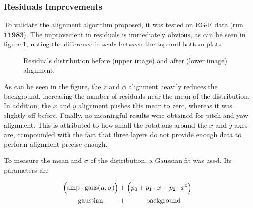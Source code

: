 \subsubsection{Residuals Improvements}
    To validate the alignment algorithm proposed, it was tested on RG-F data (run $\mathbf{11983}$).
    The improvement in residuals is immediately obvious, as can be seen in figure \ref{fig::res_comparison}, noting the difference in scale between the top and bottom plots.

    \begin{figure}[t!]
        \centering{}
        \caption[Residuals distribution improvement.]{Residuals distribution before (upper image) and after (lower image) alignment.}
        \label{fig::res_comparison}
    \end{figure}

    As can be seen in the figure, the $z$ and $\phi$ alignment heavily reduces the background, increasing the number of residuals near the mean of the distribution.
    In addition, the $x$ and $y$ alignment pushes this mean to zero, whereas it was slightly off before.
    Finally, no meaningful results were obtained for pitch and yaw alignment.
    This is attributed to how small the rotations around the $x$ and $y$ axes are, compounded with the fact that three layers do not provide enough data to perform alignment precise enough.

    To measure the mean and $\sigma$ of the distribution, a Gaussian fit was used.
    Its parameters are

     \begin{align*}
        \Big( \text{amp} \cdot \text{gaus}(\mu, \sigma) \Big) &+ \Big( p_0 + p_1\cdot x + p_2\cdot x^2 \Big) \\
        \text{gaussian} \hspace{0.8cm} &+ \hspace{1cm} \text{background}
    \end{align*}

